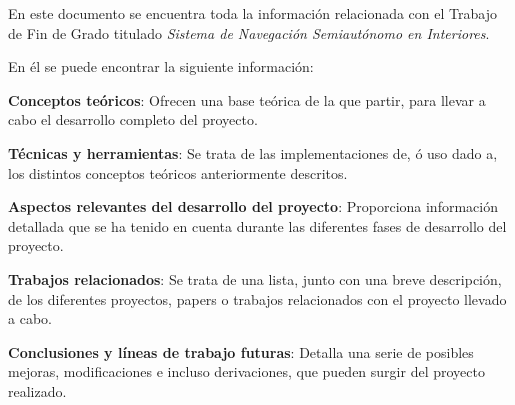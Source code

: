 
\noindent En este documento se encuentra toda la información relacionada con el Trabajo de Fin de Grado titulado \textit{Sistema de Navegación Semiautónomo en Interiores}.

\noindent En él se puede encontrar la siguiente información:
\begin{list}{•}
\item \textbf{Conceptos teóricos}: Ofrecen una base teórica de la que partir, para llevar a cabo el desarrollo completo del proyecto.
\item \textbf{Técnicas y herramientas}: Se trata de las implementaciones de, ó uso dado a, los distintos conceptos teóricos anteriormente descritos.
\item \textbf{Aspectos relevantes del desarrollo del proyecto}: Proporciona información detallada que se ha tenido en cuenta durante las diferentes fases de desarrollo del proyecto.
\item \textbf{Trabajos relacionados}: Se trata de una lista, junto con una breve descripción, de los diferentes proyectos, papers o trabajos relacionados con el proyecto llevado a cabo.
\item \textbf{Conclusiones y líneas de trabajo futuras}: Detalla una serie de posibles mejoras, modificaciones e incluso derivaciones, que pueden surgir del proyecto realizado.
\end{list}
